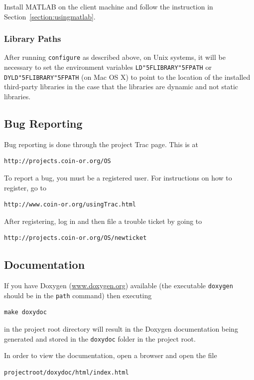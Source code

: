 \documentclass[11pt]{article}
\renewcommand{\_}{{\char"5F}}
\renewcommand{\{}{{\char"7B}}
\renewcommand{\}}{{\char"7D}}
\renewcommand{\^}{{\char"0D}}
\renewcommand{\'}{{\char"0D}}
\begin{document}
\begin{enumerate}[Step 1:]
%
Install MATLAB on the client machine and follow the instruction in Section~\ref{section:usingmatlab}.%

\subsubsection{Library Paths}

After running {\tt configure} as described above,  on Unix systems, it will be necessary to set the 
environment variables {\tt LD\_LIBRARY\_PATH} or {\tt DYLD\_LIBRARY\_PATH} (on Mac OS X) to point to the 
location of the installed third-party libraries in the case that the libraries are dynamic and not static libraries.


\subsection{Bug Reporting}

Bug reporting is done through the project Trac page. This is at
\begin{verbatim}
http://projects.coin-or.org/OS
\end{verbatim}
To report a bug, you must be a registered user.  For  instructions on  how to register, go to
\begin{verbatim}
http://www.coin-or.org/usingTrac.html
\end{verbatim}
After registering, log in and then file a trouble ticket by going to
\begin{verbatim}
http://projects.coin-or.org/OS/newticket
\end{verbatim}


\subsection{Documentation}\label{section:documentation}

%
If you have Doxygen  (\url{www.doxygen.org}) available (the executable {\tt doxygen} should be in the {\tt path} command) then executing
\begin{verbatim}
make doxydoc
\end{verbatim}
in the project root directory will result in the Doxygen documentation being generated and stored in the {\tt doxydoc} folder in the project root.

In order to view the documentation, open a browser and open the file
\begin{verbatim}
projectroot/doxydoc/html/index.html
\end{verbatim}


\end{enumerate}
\end{document}
